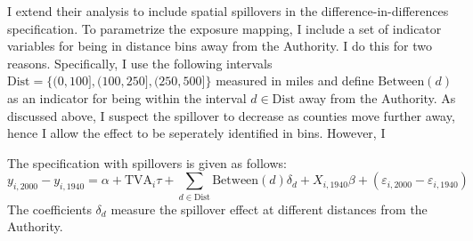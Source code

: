 \documentclass[11pt]{article}
\begin{document}
I extend their analysis to include spatial spillovers in the difference-in-differences specification. To parametrize the exposure mapping, I include a set of indicator variables for being in distance bins away from the Authority. I do this for two reasons. Specifically, I use the following intervals $\text{Dist} = \{(0, 100], (100, 250], (250, 500]\}$ measured in miles and define $\text{Between}(d)$ as an indicator for being within the interval $d \in \text{Dist}$ away from the Authority. As discussed above, I suspect the spillover to decrease as counties move further away, hence I allow the effect to be seperately identified in bins. However, I 

The specification with spillovers is given as follows:  
\begin{equation}\label{eq:tva_spillover}
    y_{i, 2000} - y_{i, 1940} = \alpha + \text{TVA}_i \tau + \sum_{d \in \text{Dist}} \text{Between}(d)\delta_d + X_{i, 1940} \beta + (\varepsilon_{i, 2000} - \varepsilon_{i, 1940})
\end{equation} 
The coefficients $\delta_d$ measure the spillover effect at different distances from the Authority.
\end{document}
